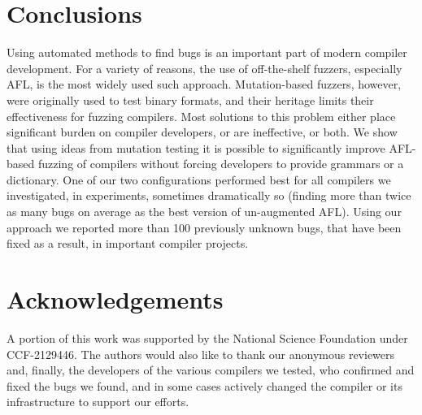 \section{Conclusions}

Using automated methods to find bugs is an important part of modern
compiler development.  For a variety of reasons, the use of
off-the-shelf fuzzers, especially AFL, is the most widely used such
approach.  Mutation-based fuzzers, however, were originally used to
test binary formats, and their heritage limits their effectiveness for
fuzzing compilers.  Most solutions to this problem either place significant
burden on compiler developers, or are ineffective, or both.  We show
that using ideas from mutation testing it is possible to significantly
improve AFL-based fuzzing of compilers without forcing developers to
provide grammars or a dictionary.  One of our two configurations
performed best for all compilers we investigated, in experiments,
sometimes dramatically so (finding more than twice as many bugs on
average as the best version of un-augmented AFL).  Using our approach
we reported more than 100 previously unknown bugs, that have been
fixed as a result, in important
compiler projects.

\section*{Acknowledgements}
\begin{sloppypar}
  A portion of this work was
  supported by the National Science Foundation under CCF-2129446.  The
authors would also like to thank our anonymous reviewers and, finally, the
developers of the various compilers we tested, who confirmed and fixed
the bugs we found, and in some cases actively changed the compiler or
its infrastructure to support our efforts.
\end{sloppypar}